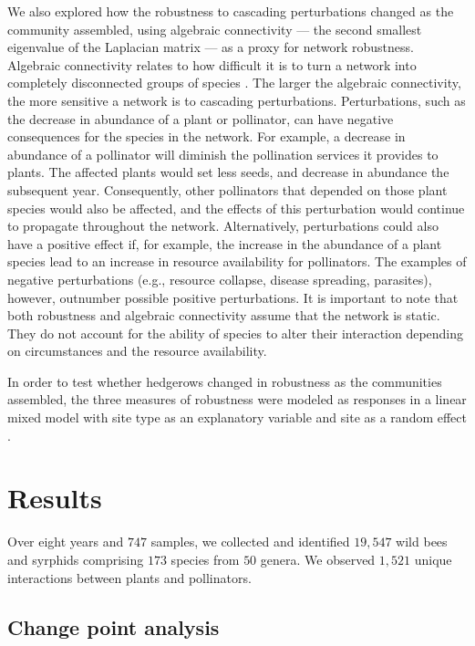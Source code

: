 \documentclass[12pt]{article}
\begin{document}
We also explored how the robustness to cascading perturbations changed
as the community assembled, using algebraic connectivity --- the
second smallest eigenvalue of the Laplacian matrix
\citep{fiedler1973algebraic} --- as a proxy for network robustness.
Algebraic connectivity relates to how difficult it is to turn a
network into completely disconnected groups of species
\citep{costa2007characterization, gibert2013spatial}. The larger the
algebraic connectivity, the more sensitive a network is to cascading
perturbations. Perturbations, such as the decrease in abundance of a
plant or pollinator, can have negative consequences for the species in
the network. For example, a decrease in abundance of a pollinator will
diminish the pollination services it provides to plants. The affected
plants would set less seeds, and decrease in abundance the subsequent
year. Consequently, other pollinators that depended on those plant
species would also be affected, and the effects of this perturbation
would continue to propagate throughout the network. Alternatively,
perturbations could also have a positive effect if, for example, the
increase in the abundance of a plant species lead to an increase in
resource availability for pollinators. The examples of negative
perturbations (e.g., resource collapse, disease spreading, parasites),
however, outnumber possible positive perturbations. It is important to
note that both robustness and algebraic connectivity assume that the
network is static. They do not account for the ability of species to
alter their interaction depending on circumstances and the resource
availability.

In order to test whether hedgerows changed in robustness as the
communities assembled, the three measures of robustness were modeled
as responses in a linear mixed model with site type as an explanatory
variable and site as a random effect \citep{lme4, lmetest}.

\section*{Results}
\label{sec:results}

Over eight years and $747$ samples, we collected and identified
$19,547$ wild bees and syrphids comprising $173$ species from $50$
genera. We observed $1,521$ unique interactions between plants and
pollinators.

\subsection*{Change point analysis}
\end{document}
